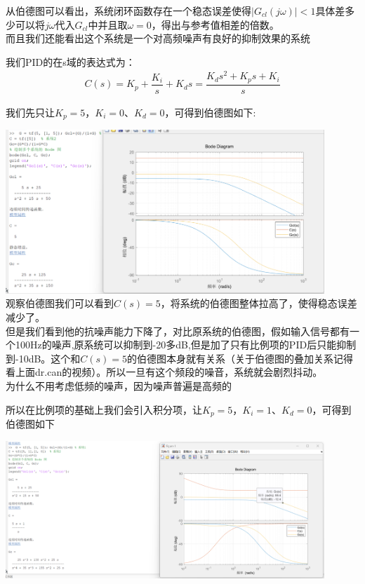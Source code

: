 \documentclass[UTF8,a4paper,12pt]{ctexart}
\begin{document}
\begin{notitlebox}
\begin{flushleft}
      \end{flushleft}
      \begin{flushleft}
        从伯德图可以看出，系统闭环函数存在一个稳态误差使得$|G_{cl}(j\omega)|<1$具体差多少可以将$j\omega$代入$G_{cl}$中并且取$\omega=0$，得出与参考值相差的倍数。\\
        而且我们还能看出这个系统是一个对高频噪声有良好的抑制效果的系统
        
      \end{flushleft}
      \begin{flushleft}
        我们PID的在s域的表达式为：
        \begin{align*}
          C(s)=K_p+\dfrac{K_i}{s}+K_ds=\dfrac{K_ds^2+K_ps+K_i}{s}
        \end{align*}
      \end{flushleft}
      \begin{flushleft}
        我们先只让$K_p=5$，$K_i=0$、$K_d=0$，可得到伯德图如下:
        \par \includegraphics[width=12cm]{picture/C_5.png}\\
        观察伯德图我们可以看到$C(s)=5$，将系统的伯德图整体拉高了，使得稳态误差减少了。\\
        但是我们看到他的抗噪声能力下降了，对比原系统的伯德图，假如输入信号都有一个100Hz的噪声,原系统可以抑制到-20多dB,但是加了只有比例项的PID后只能抑制到-10dB。这个和$C(s)=5$的伯德图本身就有关系（关于伯德图的叠加关系记得看上面dr.can的视频）。所以一旦有这个频段的噪音，系统就会剧烈抖动。\\{\scriptsize 为什么不用考虑低频的噪声，因为噪声普遍是高频的}
      \end{flushleft}
      \vspace{2cm}
      \begin{flushleft}
        所以在比例项的基础上我们会引入积分项，让$K_p=5$，$K_i=1$、$K_d=0$，可得到伯德图如下
        \par \includegraphics[width=12cm]{picture/C_5_I_1.png}

\end{flushleft}
\end{notitlebox}
\end{document}
